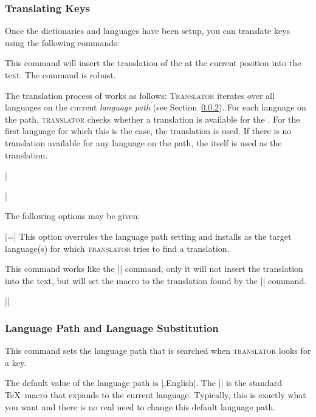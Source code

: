 \subsubsection{Translating Keys}

Once the dictionaries and languages have been setup, you can translate keys using the following commands:

\begin{command}{\translate{}}
  This command will insert the translation of the  at the current position into the text. The command is robust.

  The translation process of  works as follows: \textsc{Translator} iterates over all languages on the current \emph{language  path} (see Section~\ref{section-language-path}). For each language on the path, \textsc{translator} checks whether a translation is available for the . For the first language for which this is the case, the translation is used. If there is no translation available for any language on the path, the  itself is used as the translation.

  \example
  |\caption{~2.}|

  The following options may be given:
  \begin{itemize}
    |=| This option overrules the language path setting and installs  as the target language(s) for which \textsc{translator} tries to find a translation.
  \end{itemize}
\end{command}

\begin{command}{\translatelet{}}
  This command works like the |\translate| command, only it will not insert the translation into the text, but will set the macro  to the translation found by the |\translate| command.

  \example
  |\translatelet{}|
\end{command}

\subsubsection{Language Path and Language Substitution}
\label{section-language-path}

\begin{command}{\languagepath{}}
  This command sets the language path that is searched when \textsc{translator} looks for a key.

  The default value of the language path is |\languagename,English|. The |\languagename| is the standard \TeX\ macro that expands to the current language. Typically, this is exactly what you want and there is no real need to change this default language path.
\end{command}

